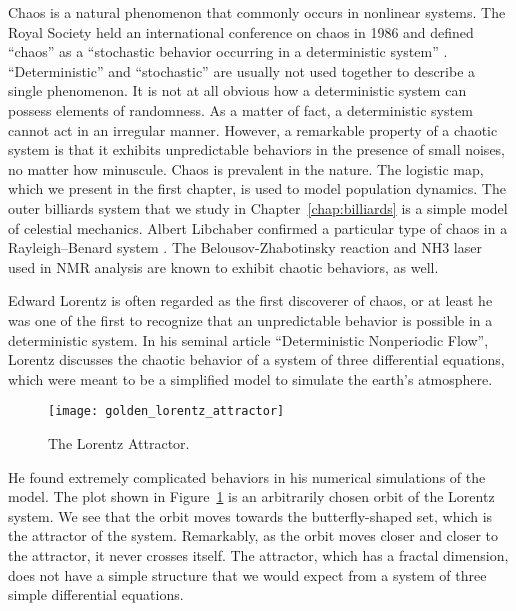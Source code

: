 \documentclass[10pt,twoside,draft]{book}
\begin{document}
Chaos is a natural phenomenon that commonly occurs in nonlinear systems.
The Royal Society held an international conference on chaos in 1986 and defined ``chaos'' as a ``stochastic behavior occurring in a deterministic system'' \citep{stewart}.
``Deterministic'' and ``stochastic'' are usually not used together to describe a single phenomenon.
It is not at all obvious how a deterministic system can possess elements of randomness.
As a matter of fact, a deterministic system cannot act in an irregular manner.
However, a remarkable property of a chaotic system is that it exhibits unpredictable behaviors in the presence of small noises, no matter how minuscule.
Chaos is prevalent in the nature.
The logistic map, which we present in the first chapter, is used to model population dynamics.
The outer billiards system that we study in Chapter~\ref{chap:billiards} is a simple model of celestial mechanics.
Albert Libchaber confirmed a particular type of chaos in a Rayleigh–Benard system \citep{libchaber}.
The Belousov-Zhabotinsky reaction \citep{zhang} and NH3 laser used in NMR analysis \citep{kantz-schreiber} are known to exhibit chaotic behaviors, as well.


Edward Lorentz is often regarded as the first discoverer of chaos, or at least he was one of the first to recognize that an unpredictable behavior is possible in a deterministic system.
In his seminal article ``Deterministic Nonperiodic Flow'', Lorentz discusses the chaotic behavior of a system of three differential equations, which were meant to be a simplified model to simulate the earth's atmosphere.
\begin{figure}[ht]
  \centering
  \texttt{[image: golden\_lorentz\_attractor]}
  \caption{The Lorentz Attractor.}
  \label{fig:lorentz}
\end{figure}
He found extremely complicated behaviors in his numerical simulations of the model.
The plot shown in Figure~\ref{fig:lorentz} is an arbitrarily chosen orbit of the Lorentz system.
We see that the orbit moves towards the butterfly-shaped set, which is the attractor of the system.
Remarkably, as the orbit moves closer and closer to the attractor, it never crosses itself.
The attractor, which has a fractal dimension, does not have a simple structure that we would expect from a system of three simple differential equations.
\end{document}
